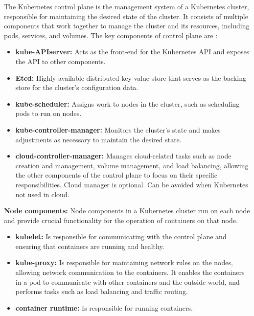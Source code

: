 The Kubernetes control plane is the management system of a Kubernetes cluster, responsible for maintaining the desired state of the cluster. It consists of multiple components that work together to manage the cluster and its resources, including pods, services, and volumes. The key components of control plane are \cite{masteringKubernetesConcepts}:
\begin{itemize}
    \item \textbf{kube-APIserver:} Acts as the front-end for the Kubernetes API and exposes the API to other components. \cite{docuKubeComponents}
    \item \textbf{Etcd:} Highly available distributed key-value store that serves as the backing store for the cluster's configuration data. \cite{Dobies2020}
    \item \textbf{kube-scheduler:} Assigns work to nodes in the cluster, such as scheduling pods to run on nodes. \cite{kubeUpAndRunningPods}
    \item \textbf{kube-controller-manager:} Monitors the cluster's state and makes adjustments as necessary to maintain the desired state. \cite{masteringKubernetesConcepts}
    \item \textbf{cloud-controller-manager:} Manages cloud-related tasks such as node creation and management, volume management, and load balancing, allowing the other components of the control plane to focus on their specific responsibilities. Cloud manager is optional. Can be avoided when Kubernetes not used in cloud. \cite{docuKubeComponents}
\end{itemize}
\textbf{Node components:}
Node components in a Kubernetes cluster run on each node and provide crucial functionality for the operation of containers on that node. \cite{docuKubeComponents}
\begin{itemize}
    \item \textbf{kubelet:} Is responsible for communicating with the control plane and ensuring that containers are running and healthy. \cite{kubeUpAndRunning}
    \item \textbf{kube-proxy:} Is responsible for maintaining network rules on the nodes, allowing network communication to the containers. It enables the containers in a pod to communicate with other containers and the outside world, and performs tasks such as load balancing and traffic routing. \cite{kubeUpAndRunning}
    \item \textbf{container runtime:} Is responsible for running containers. \cite{docuKubeComponents}
\end{itemize}

